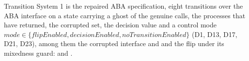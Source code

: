 \begin{definition}
  \label{def:aba-spec}
  \leanok
  Transition System 1 is the repaired ABA specification, eight transitions over the ABA interface on a state carrying a ghost of the genuine calls, the processes that have returned, the corrupted set, the decision value and a control mode $mode \in \{flipEnabled, decisionEnabled, noTransitionEnabled\}$ (D1, D13, D17, D21, D23), among them the corrupted interface  and  and the flip  under its mixedness guard:  and .
\end{definition}
